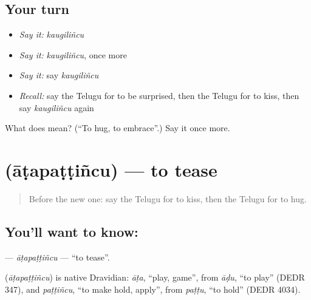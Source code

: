 \subsection*{Your turn}
\begin{itemize}
\raggedright
  \item \emph{Say it:} \emph{kaugiliñcu}
  \item \emph{Say it:} \emph{kaugiliñcu}, once more
  \item \emph{Say it:} say \emph{kaugiliñcu}
  \item \emph{Recall:} say the Telugu for to be surprised, then the Telugu for to kiss, then say \emph{kaugiliñcu} again
\end{itemize}

\begin{tcolorbox}[breakable,colback=teal!4,colframe=teal!35!black,title={Before you move on}]
What does  mean? (\textquotedblleft{}To hug, to embrace\textquotedblright{}.) Say it once more.
\end{tcolorbox}
\section[\texorpdfstring{\te{ఆటపట్టించు} (āṭapaṭṭiñcu)}{ఆటపట్టించు (āṭapaṭṭiñcu)}]{ (āṭapaṭṭiñcu) — to tease}

\label{lesson:TE-C162-atapattincu}



\begin{quote}
Before the new one: say the Telugu for to kiss, then the Telugu for to hug.
\end{quote}

\subsection*{You'll want to know: }
\textbf{} — \emph{āṭapaṭṭiñcu} — \textquotedblleft{}to tease\textquotedblright{}.

\begin{cousinweb}
\textbf{} (\emph{āṭapaṭṭiñcu}) is native Dravidian: \emph{āṭa}, \textquotedblleft{}play, game\textquotedblright{}, from \emph{āḍu}, \textquotedblleft{}to play\textquotedblright{} (DEDR 347), and \emph{paṭṭiñcu}, \textquotedblleft{}to make hold, apply\textquotedblright{}, from \emph{paṭṭu}, \textquotedblleft{}to hold\textquotedblright{} (DEDR 4034).
\end{cousinweb}

